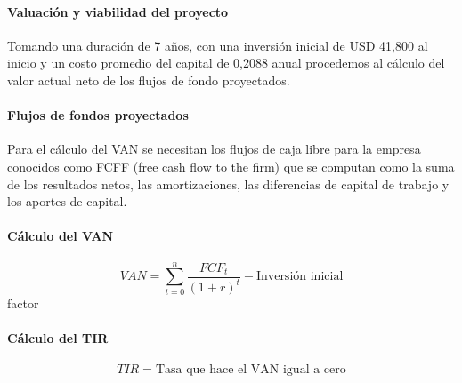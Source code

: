 \paragraph{Valuación y viabilidad del proyecto}

Tomando una duración de 7 años, con una inversión inicial de USD 41,800 al inicio y un costo promedio del capital de 0,2088 anual procedemos al cálculo del valor actual neto de los flujos de fondo proyectados. 

\paragraph{Flujos de fondos proyectados}

Para el cálculo del VAN se necesitan los flujos de caja libre para la empresa conocidos como FCFF (free cash flow to the firm) que se computan como la suma de los resultados netos, las amortizaciones, las diferencias de capital de trabajo y los aportes de capital. 

\paragraph{Cálculo del VAN}

\[VAN = \sum_{t=0}^{n} \frac{FCF_t}{(1+r)^t} - \text{Inversión inicial}\]
factor
\paragraph{Cálculo del TIR}

\[TIR = \text{Tasa que hace el VAN igual a cero}\]

\clearpage

